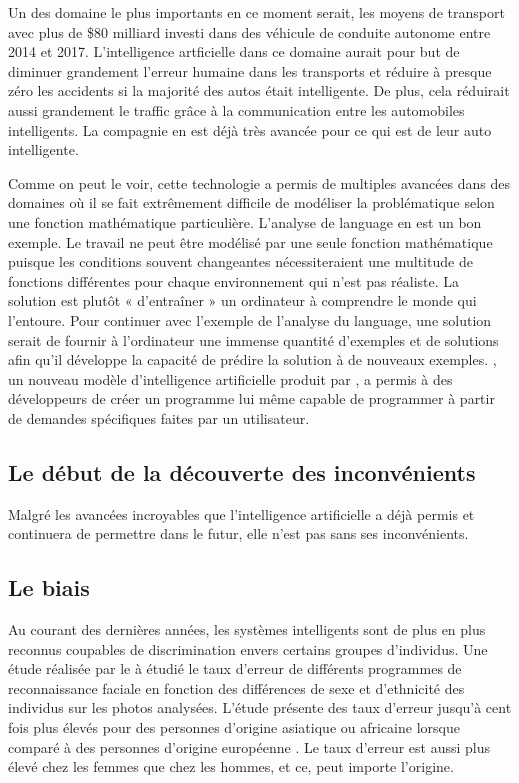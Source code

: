\documentclass[letterpaper,10pt,french]{sphinxmanual}
\begin{document}
Un des domaine le plus importants en ce moment serait, les moyens de transport avec plus de \$80
milliard investi dans des véhicule de conduite autonome entre 2014 et 2017. L’intelligence
artficielle dans ce domaine aurait pour but de diminuer grandement l’erreur humaine dans les transports
et réduire à presque zéro les accidents si la majorité des autos était intelligente. De plus, cela réduirait
aussi grandement le traffic grâce à la communication entre les automobiles intelligents. La compagnie 
en est déjà très avancée pour ce qui est de leur auto intelligente.

Comme on peut le voir, cette technologie a permis de multiples avancées dans des domaines où
il se fait extrêmement difficile de modéliser la problématique selon une
fonction mathématique particulière. L’analyse de language en est un bon exemple.
Le travail ne peut être modélisé par une seule fonction mathématique puisque
les conditions souvent changeantes nécessiteraient une multitude de fonctions
différentes pour chaque environnement qui n’est pas réaliste. La solution est
plutôt « d’entraîner » un ordinateur à comprendre le monde qui l’entoure.
Pour continuer avec l’exemple de l’analyse du language, une solution serait
de fournir à l’ordinateur une immense quantité d’exemples et de solutions afin
qu’il développe la capacité de prédire la solution à de nouveaux exemples.
,
un nouveau modèle d’intelligence artificielle produit par
, a permis à des développeurs de créer un programme
lui même capable de programmer à partir de demandes spécifiques faites par un
utilisateur.


\subsection{Le début de la découverte des inconvénients}
\label{\detokenize{enonce_sujet:le-debut-de-la-decouverte-des-inconvenients}}
Malgré les avancées incroyables que l’intelligence artificielle a déjà permis et
continuera de permettre dans le futur, elle n’est pas sans ses inconvénients.


\subsection{Le biais}
\label{\detokenize{enonce_sujet:le-biais}}
Au
courant des dernières années, les systèmes intelligents sont de plus en plus
reconnus coupables de discrimination envers certains groupes d’individus. Une
étude réalisée par le  à étudié le taux d’erreur de
différents programmes de reconnaissance faciale en fonction des différences de
sexe et d’ethnicité des individus sur les photos analysées. L’étude
présente des taux d’erreur
jusqu’à cent fois plus élevés pour des personnes d’origine asiatique ou
africaine lorsque comparé à des personnes d’origine européenne .
Le taux d’erreur est aussi plus élevé chez les femmes que chez les hommes, et
ce, peut importe l’origine.
\end{document}
